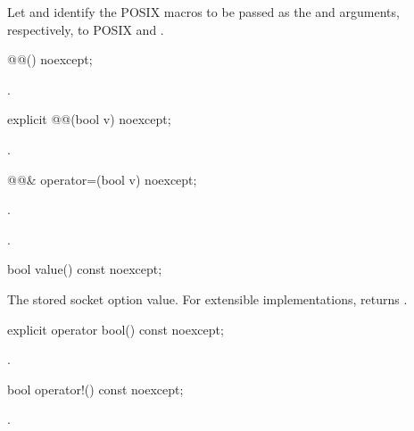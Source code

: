 \pnum
Let  and  identify the POSIX macros to be passed as the  and  arguments, respectively, to POSIX  and .

\begin{itemdecl}
@@() noexcept;
\end{itemdecl}

\begin{itemdescr}
\pnum
\postconditions {}.
\end{itemdescr}

\begin{itemdecl}
explicit @@(bool v) noexcept;
\end{itemdecl}

\begin{itemdescr}
\pnum
\postconditions {}.
\end{itemdescr}

\begin{itemdecl}
@@& operator=(bool v) noexcept;
\end{itemdecl}

\begin{itemdescr}
\pnum
\returns {}.

\pnum
\postconditions {}.
\end{itemdescr}

\begin{itemdecl}
bool value() const noexcept;
\end{itemdecl}

\begin{itemdescr}
\pnum
\returns The stored socket option value. For extensible implementations, returns .
\end{itemdescr}

\begin{itemdecl}
explicit operator bool() const noexcept;
\end{itemdecl}

\begin{itemdescr}
\pnum
\returns {}.
\end{itemdescr}

\begin{itemdecl}
bool operator!() const noexcept;
\end{itemdecl}

\begin{itemdescr}
\pnum
\returns {}.
\end{itemdescr}

